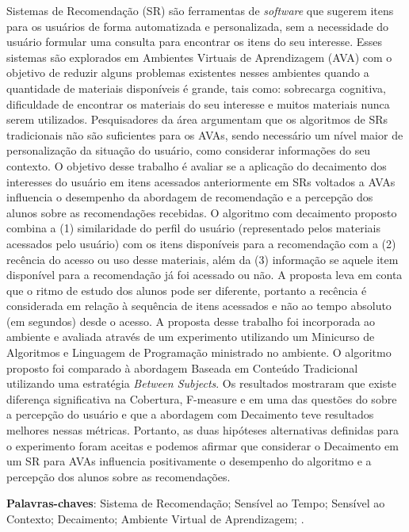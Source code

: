 \begin{resumo}
  Sistemas de Recomendação (SR) são ferramentas de \textit{software} que sugerem itens para os usuários de forma automatizada e
  personalizada, sem a necessidade do usuário formular uma consulta para encontrar os itens do seu interesse. Esses
  sistemas são explorados em Ambientes Virtuais de Aprendizagem (AVA) com o objetivo de reduzir alguns problemas
  existentes nesses ambientes quando a quantidade de materiais disponíveis é grande, tais como: sobrecarga cognitiva,
  dificuldade de encontrar os materiais do seu interesse e muitos materiais nunca serem utilizados. Pesquisadores da
  área argumentam que os algoritmos de SRs tradicionais não são suficientes para os AVAs, sendo necessário um nível
  maior de personalização da situação do usuário, como considerar informações do seu contexto. O objetivo desse trabalho é
  avaliar se a aplicação do decaimento dos interesses do usuário em itens acessados anteriormente em SRs voltados a AVAs
  influencia o desempenho da abordagem de recomendação e a percepção dos alunos sobre as recomendações recebidas. O
  algoritmo com decaimento proposto combina a (1) similaridade do perfil do usuário
  (representado pelos materiais acessados pelo usuário) com os itens disponíveis para a recomendação com a (2) recência
  do acesso ou uso desse materiais, além da (3) informação se aquele item disponível para a recomendação já foi acessado
  ou não. A proposta leva em conta que o ritmo de estudo dos alunos pode ser diferente, portanto a recência é
  considerada em relação à sequência de itens acessados e não ao tempo absoluto (em segundos) desde o acesso. A proposta
  desse trabalho foi incorporada ao ambiente \adaptwebspace e avaliada através de um experimento utilizando um Minicurso
  de Algoritmos e Linguagem de Programação ministrado no ambiente. O algoritmo proposto foi comparado à abordagem
  Baseada em Conteúdo Tradicional utilizando uma estratégia \textit{Between Subjects}. Os resultados mostraram
  que existe diferença significativa na Cobertura, F-measure e em uma das questões do sobre a percepção do usuário e que
  a abordagem com Decaimento teve resultados melhores nessas métricas. Portanto, as  duas hipóteses alternativas
  definidas para o experimento foram aceitas e podemos afirmar que considerar o Decaimento em um SR
  para AVAs influencia positivamente o desempenho do algoritmo e a percepção dos alunos sobre as recomendações.

  \vspace{\onelineskip}

  \noindent
  \textbf{Palavras-chaves}: Sistema de Recomendação; Sensível ao Tempo; Sensível ao Contexto; Decaimento; Ambiente Virtual de Aprendizagem; \adaptweb.
\end{resumo}

